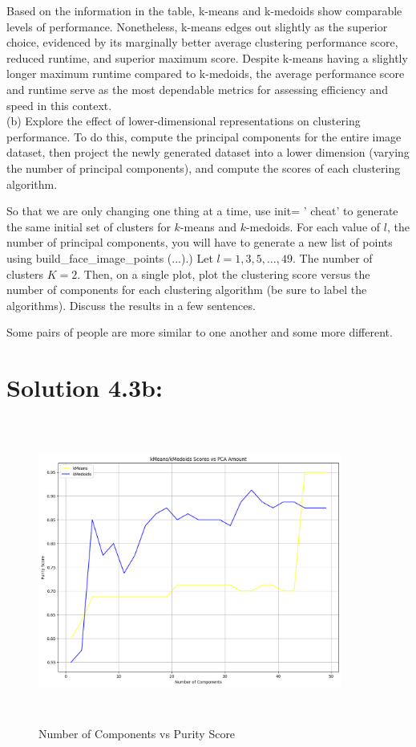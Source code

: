 \documentclass[10pt]{article}
\begin{document}
Based on the information in the table, k-means and k-medoids show comparable levels of performance. Nonetheless, k-means edges out slightly as the superior choice, evidenced by its marginally better average clustering performance score, reduced runtime, and superior maximum score. Despite k-means having a slightly longer maximum runtime compared to k-medoids, the average performance score and runtime serve as the most dependable metrics for assessing efficiency and speed in this context. \\

(b) Explore the effect of lower-dimensional representations on clustering performance. To do this, compute the principal components for the entire image dataset, then project the newly generated dataset into a lower dimension (varying the number of principal components), and compute the scores of each clustering algorithm.

So that we are only changing one thing at a time, use init= ' cheat' to generate the same initial set of clusters for $k$-means and $k$-medoids. For each value of $l$, the number of principal components, you will have to generate a new list of points using build\_face\_image\_points (...).) Let $l=1,3,5, \ldots, 49$. The number of clusters $K=2$. Then, on a single plot, plot the clustering score versus the number of components for each clustering algorithm (be sure to label the algorithms). Discuss the results in a few sentences.

Some pairs of people are more similar to one another and some more different.

\section*{Solution 4.3b:}

\begin{figure}[H]
  \centering
  \includegraphics[width=10cm, height=10cm]{images/4.3b_graph.png}
  \caption{Number of Components vs Purity Score}
  \label{fig:Clusters}
\end{figure}
\end{document}
